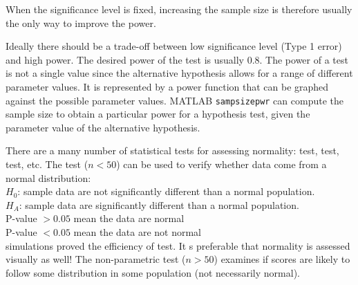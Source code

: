 When the significance level is fixed, increasing the sample size is therefore usually the only way to improve the power.

Ideally there should be a trade-off between low significance level (Type 1 error) and high power. The desired power of the test is usually 0.8. The power of a test is not a single value since the alternative hypothesis allows for a range of different parameter values. It is represented by a power function that can be graphed against the possible parameter values. MATLAB \texttt{sampsizepwr} can compute the sample size to obtain a particular power for a hypothesis test, given the parameter value of the alternative hypothesis.



There are a many number of statistical tests for assessing normality:  test,  test,  test, etc. The  test ($n<50$) can be used to verify whether data come from a normal distribution: \\
$H_0$: sample data are not significantly different than a normal population. \\
$H_A$: sample data are significantly different than a normal population. \\
P-value $>0.05$ mean the data are normal \\
P-value $<0.05$ mean the data are not normal \\
 simulations proved the efficiency of  test. It s preferable that normality is assessed visually as well! The  non-parametric test ($n>50$) examines if scores are likely to follow some distribution in some population (not necessarily normal).